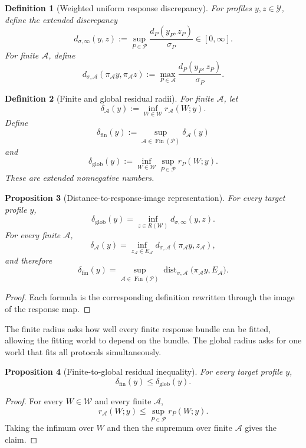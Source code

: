 \documentclass[11pt]{article}
\newtheorem{definition}{Definition}[section]
\newtheorem{proposition}[definition]{Proposition}
\newcommand{\W}{\mathcal W}
\newcommand{\Pcal}{\mathcal P}
\newcommand{\Acal}{\mathcal A}
\newcommand{\Y}{\mathcal Y}
\newcommand{\Fin}{\operatorname{Fin}}
\begin{document}
\begin{definition}[Weighted uniform response discrepancy]
For profiles $y,z\in\Y$, define the extended discrepancy
\[
d_{\sigma,\infty}(y,z)
:=
\sup_{P\in\Pcal}
\frac{d_P(y_P,z_P)}{\sigma_P}
\in[0,\infty].
\]
For finite $\Acal$, define
\[
d_{\sigma,\Acal}
(\pi_{\Acal}y,\pi_{\Acal}z)
:=
\max_{P\in\Acal}
\frac{d_P(y_P,z_P)}{\sigma_P}.
\]
\end{definition}

\begin{definition}[Finite and global residual radii]
For finite $\Acal$, let
\[
\delta_{\Acal}(y)
:=
\inf_{W\in\W} r_{\Acal}(W;y).
\]
Define
\[
\delta_{\mathrm{fin}}(y)
:=
\sup_{\Acal\in\Fin(\Pcal)}
\delta_{\Acal}(y)
\]
and
\[
\delta_{\mathrm{glob}}(y)
:=
\inf_{W\in\W}
\sup_{P\in\Pcal}r_P(W;y).
\]
These are extended nonnegative numbers.
\end{definition}

\begin{proposition}[Distance-to-response-image representation]
For every target profile $y$,
\[
\delta_{\mathrm{glob}}(y)
=
\inf_{z\in R(\W)}d_{\sigma,\infty}(y,z).
\]
For every finite $\Acal$,
\[
\delta_{\Acal}(y)
=
\inf_{z_{\Acal}\in E_{\Acal}}
d_{\sigma,\Acal}
(\pi_{\Acal}y,z_{\Acal}),
\]
and therefore
\[
\delta_{\mathrm{fin}}(y)
=
\sup_{\Acal\in\Fin(\Pcal)}
\operatorname{dist}_{\sigma,\Acal}
\bigl(\pi_{\Acal}y,E_{\Acal}\bigr).
\]
\end{proposition}

\begin{proof}
Each formula is the corresponding definition rewritten through the image of
the response map.
\end{proof}

The finite radius asks how well every finite response bundle can be fitted,
allowing the fitting world to depend on the bundle. The global radius asks for
one world that fits all protocols simultaneously.

\begin{proposition}[Finite-to-global residual inequality]
For every target profile $y$,
\[
\delta_{\mathrm{fin}}(y)
\le
\delta_{\mathrm{glob}}(y).
\]
\end{proposition}

\begin{proof}
For every $W\in\W$ and every finite $\Acal$,
\[
r_{\Acal}(W;y)
\le
\sup_{P\in\Pcal}r_P(W;y).
\]
Taking the infimum over $W$ and then the supremum over finite $\Acal$ gives the
claim.
\end{proof}
\end{document}
